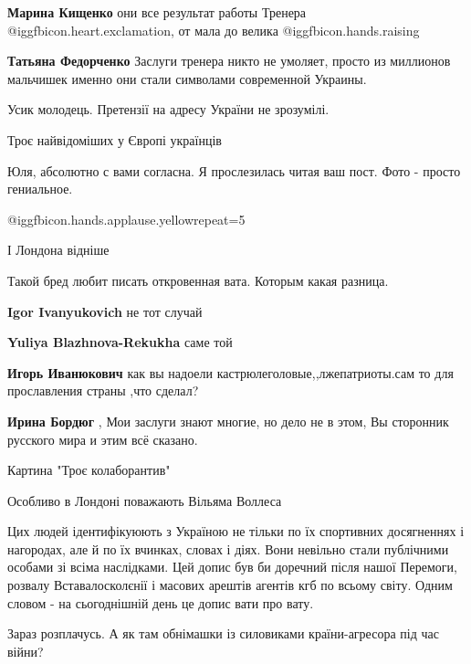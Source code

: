 \begin{itemize}
\begin{itemize} %
\textbf{Марина Кищенко} они все результат работы Тренера @igg{fbicon.heart.exclamation}, от мала до велика @igg{fbicon.hands.raising} 

\textbf{Татьяна Федорченко} Заслуги тренера никто не умоляет, просто из миллионов мальчишек именно они стали символами современной Украины.
\end{itemize} %

Усик молодець. Претензії на адресу України не зрозумілі.

Троє найвідоміших у Європі українців

Юля, абсолютно с вами согласна. Я прослезилась читая ваш пост. Фото - просто гениальное.

 @igg{fbicon.hands.applause.yellow}{repeat=5} 

І Лондона відніше

Такой бред любит писать откровенная вата. Которым какая разница.

\begin{itemize} %
\textbf{Igor Ivanyukovich} не тот случай

\textbf{Yuliya Blazhnova-Rekukha} саме той

\textbf{Игорь Иванюкович} как вы надоели кастрюлеголовые,,лжепатриоты.сам то для прославления страны ,что сделал?

\textbf{Ирина Бордюг} , Мои заслуги знают многие, но дело не в этом, Вы сторонник русского мира и этим всё сказано.
\end{itemize} %

Картина "Троє колаборантив"

Особливо в Лондоні поважають Вільяма Воллеса


Цих людей ідентифікуюють з Україною не тільки по їх спортивних досягненнях і
нагородах, але й по їх вчинках, словах і діях. Вони невільно стали публічними
особами зі всіма наслідками. Цей допис був би доречний після нашої Перемоги,
розвалу Вставалосколєнії і масових арештів агентів кгб по всьому світу. Одним
словом - на сьогоднішній день це допис вати про вату.

Зараз розплачусь. А як там обнімашки із силовиками країни-агресора під час війни?


\end{itemize}
